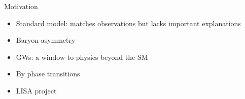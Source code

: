 Motivation
\begin{itemize}
    \item Standard model: matches observations but lacks important explanations
    \item Baryon asymmetry
    \item GWs: a window to physics beyond the SM
    \item By phase transitions
    \item LISA project
\end{itemize}

